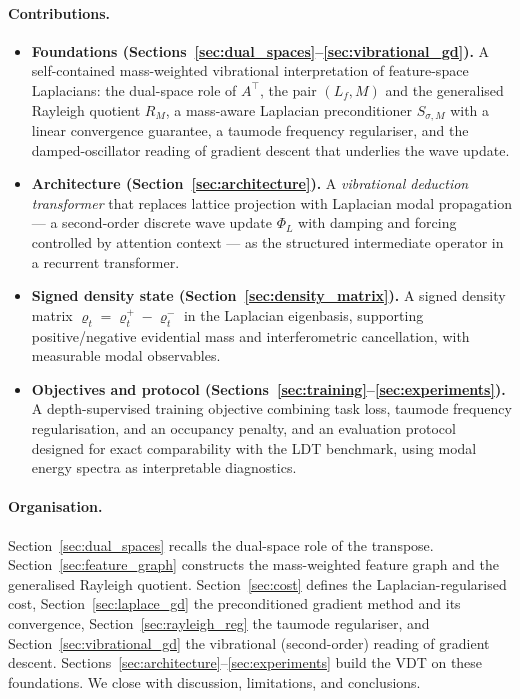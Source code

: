 \documentclass[12pt,a4paper]{article}
\theoremstyle{plain}
\theoremstyle{definition}
\theoremstyle{remark}
\newcommand{\1}{\mathbf{1}}
\newcommand{\VDT}{\textsc{VDT}}
\begin{document}
\paragraph{Contributions.}
\begin{itemize}
  \item \textbf{Foundations (Sections~\ref{sec:dual_spaces}--\ref{sec:vibrational_gd}).}
        A self-contained mass-weighted vibrational interpretation of
        feature-space Laplacians: the dual-space role of $A^\top$, the
        pair $(L_f,M)$ and the generalised Rayleigh quotient $R_M$, a
        mass-aware Laplacian preconditioner $S_{\sigma,M}$ with a linear
        convergence guarantee, a taumode frequency regulariser, and the
        damped-oscillator reading of gradient descent that underlies the
        wave update.
  \item \textbf{Architecture (Section~\ref{sec:architecture}).}
        A \emph{vibrational deduction transformer} that replaces lattice
        projection with Laplacian modal propagation --- a second-order
        discrete wave update $\Phi_L$ with damping and forcing controlled
        by attention context --- as the structured intermediate operator
        in a recurrent transformer.
  \item \textbf{Signed density state (Section~\ref{sec:density_matrix}).}
        A signed density matrix $\varrho_t = \varrho_t^{+}-\varrho_t^{-}$
        in the Laplacian eigenbasis, supporting positive/negative
        evidential mass and interferometric cancellation, with
        measurable modal observables.
  \item \textbf{Objectives and protocol (Sections~\ref{sec:training}--\ref{sec:experiments}).}
        A depth-supervised training objective combining task loss,
        taumode frequency regularisation, and an occupancy penalty, and
        an evaluation protocol designed for exact comparability with the
        \textsc{LDT} benchmark, using modal energy spectra as
        interpretable diagnostics.
\end{itemize}

\paragraph{Organisation.}
Section~\ref{sec:dual_spaces} recalls the dual-space role of the
transpose. Section~\ref{sec:feature_graph} constructs the mass-weighted
feature graph and the generalised Rayleigh quotient.
Section~\ref{sec:cost} defines the Laplacian-regularised cost,
Section~\ref{sec:laplace_gd} the preconditioned gradient method and its
convergence, Section~\ref{sec:rayleigh_reg} the taumode regulariser, and
Section~\ref{sec:vibrational_gd} the vibrational (second-order) reading
of gradient descent. Sections~\ref{sec:architecture}--\ref{sec:experiments}
build the \VDT{} on these foundations. We close with discussion,
limitations, and conclusions.
\end{document}
